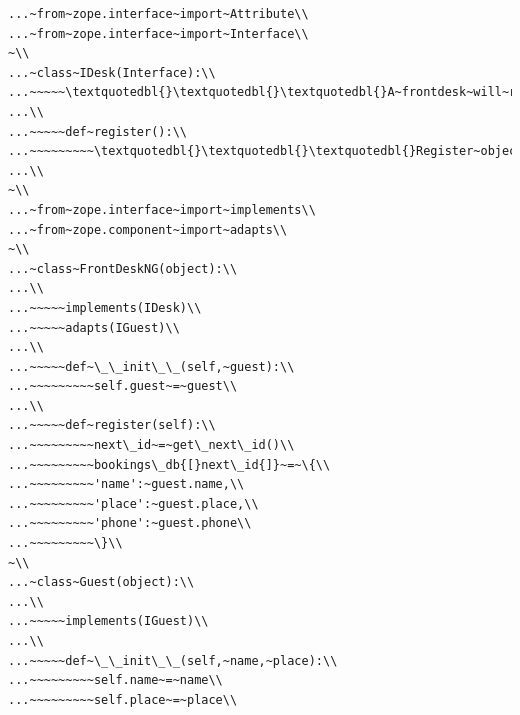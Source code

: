 \documentclass[a4paper,openany,twoside,draft]{book}
\begin{document}
\begin{verbatim}
...~from~zope.interface~import~Attribute\\
...~from~zope.interface~import~Interface\\
~\\
...~class~IDesk(Interface):\\
...~~~~~\textquotedbl{}\textquotedbl{}\textquotedbl{}A~frontdesk~will~register~object's~details\textquotedbl{}\textquotedbl{}\textquotedbl{}\\
...\\
...~~~~~def~register():\\
...~~~~~~~~~\textquotedbl{}\textquotedbl{}\textquotedbl{}Register~object's~details\textquotedbl{}\textquotedbl{}\textquotedbl{}\\
...\\
~\\
...~from~zope.interface~import~implements\\
...~from~zope.component~import~adapts\\
~\\
...~class~FrontDeskNG(object):\\
...\\
...~~~~~implements(IDesk)\\
...~~~~~adapts(IGuest)\\
...\\
...~~~~~def~\_\_init\_\_(self,~guest):\\
...~~~~~~~~~self.guest~=~guest\\
...\\
...~~~~~def~register(self):\\
...~~~~~~~~~next\_id~=~get\_next\_id()\\
...~~~~~~~~~bookings\_db{[}next\_id{]}~=~\{\\
...~~~~~~~~~'name':~guest.name,\\
...~~~~~~~~~'place':~guest.place,\\
...~~~~~~~~~'phone':~guest.phone\\
...~~~~~~~~~\}\\
~\\
...~class~Guest(object):\\
...\\
...~~~~~implements(IGuest)\\
...\\
...~~~~~def~\_\_init\_\_(self,~name,~place):\\
...~~~~~~~~~self.name~=~name\\
...~~~~~~~~~self.place~=~place\\

\end{verbatim}
\end{document}
